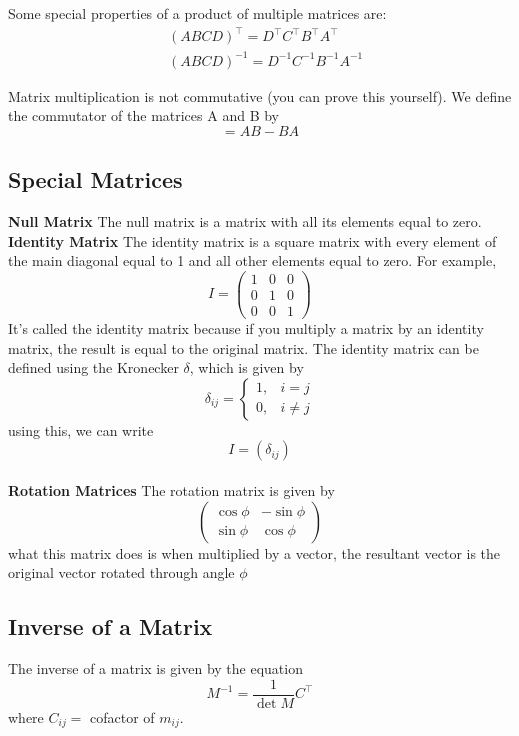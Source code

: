 \documentclass[oneside]{book}
\numberwithin{equation}{chapter} %
\begin{document}
Some special properties of a product of multiple matrices are:
\begin{align}
	&(ABCD)^\intercal=D^\intercal C^\intercal B^\intercal A^\intercal\\
	&(ABCD)^{-1}=D^{-1}C^{-1}B^{-1}A^{-1}
\end{align}

Matrix multiplication is not commutative (you can prove this yourself). We define the commutator of the matrices A and B by 
\begin{equation}
	[A,B]=AB-BA
\end{equation}
\subsection{Special Matrices}
\textbf{Null Matrix} The null matrix is a matrix with all its elements equal to zero. \\

\textbf{Identity Matrix} The identity matrix is a square matrix with every element of the main diagonal equal to 1 and all other elements equal to zero. For example,
$$
I=
\begin{pmatrix}
	1&0&0\\0&1&0\\0&0&1
\end{pmatrix}
$$
It's called the identity matrix because if you multiply a matrix by an identity matrix, the result is equal to the original matrix. The identity matrix can be defined using the Kronecker $\delta$, which is given by 
\begin{equation}
	\delta_{ij}=
	\begin{cases}
		1,&i=j\\0,&i\ne j
	\end{cases}
\end{equation}
 using this, we can write
 $$I=(\delta_{ij})$$
 \\

\textbf{Rotation Matrices}
The rotation matrix is given by 
\begin{equation}
	\begin{pmatrix}
		\cos\phi&-\sin\phi\\\sin\phi&\cos\phi
	\end{pmatrix}
\end{equation}
what this matrix does is when multiplied by a vector, the resultant vector is the original vector rotated through angle $\phi$
\subsection{Inverse of a Matrix}
The inverse of a matrix is given by the equation
\begin{equation}
	M^{-1}=\frac{1}{\det M}C^\intercal
\end{equation}
where $C_{ij}=$ cofactor of $m_{ij}$. 
\end{document}
